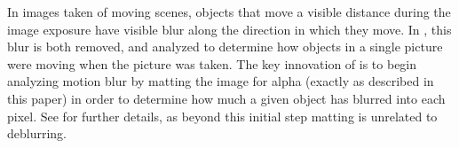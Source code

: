 In images taken of moving scenes, objects that move a visible distance during the image exposure have visible blur along the direction in which they move. In \cite{dai08}, this blur is both removed, and analyzed to determine how objects in a single picture were moving when the picture was taken. The key innovation of \cite{dai08} is to begin analyzing motion blur by matting the image for alpha (exactly as described in this paper) in order to determine how much a given object has blurred into each pixel. See \cite{dai08} for further details, as beyond this initial step matting is unrelated to deblurring.